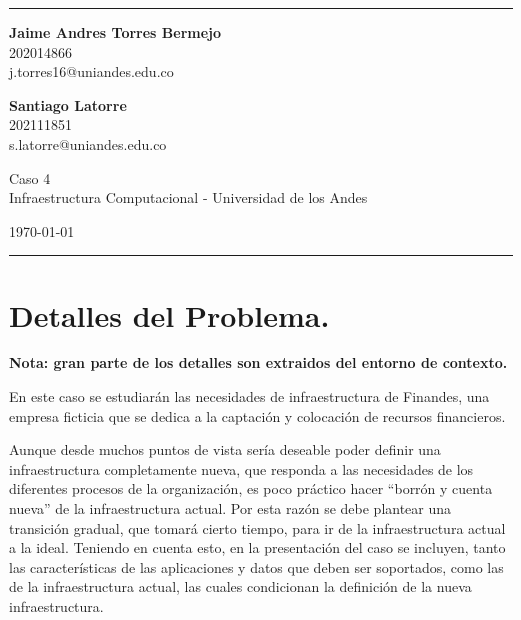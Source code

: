 \documentclass[a4paper]{article}
\begin{document}

\fancyhead[C]{}
\hrule \medskip %
\begin{minipage}{0.295\textwidth} 
\raggedright
\footnotesize
\textbf{Jaime Andres Torres Bermejo} \hfill\\   
202014866\hfill\\
j.torres16@uniandes.edu.co

\textbf{Santiago Latorre} \hfill\\  
202111851 \hfill\\  
s.latorre@uniandes.edu.co

\end{minipage}
\begin{minipage}{0.4\textwidth} 
\centering 
\large 
Caso 4\\ 
\normalsize 
Infraestructura Computacional - Universidad de los Andes\\ 
\end{minipage}
\begin{minipage}{0.295\textwidth} 
\raggedleft
\today\hfill\\
\end{minipage}
\medskip\hrule 
\bigskip

\section{Detalles del Problema.}

\textbf{Nota: gran parte de los detalles son extraidos del entorno de contexto.}

En este caso se estudiarán las necesidades de infraestructura de Finandes, una empresa ficticia que se dedica a la
captación y colocación de recursos financieros.

Aunque desde muchos puntos de vista sería deseable poder definir una infraestructura completamente nueva, que
responda a las necesidades de los diferentes procesos de la organización, es poco práctico hacer “borrón y cuenta
nueva” de la infraestructura actual. Por esta razón se debe plantear una transición gradual, que tomará cierto
tiempo, para ir de la infraestructura actual a la ideal. Teniendo en cuenta esto, en la presentación del caso se
incluyen, tanto las características de las aplicaciones y datos que deben ser soportados, como las de la
infraestructura actual, las cuales condicionan la definición de la nueva infraestructura.
\end{document}
